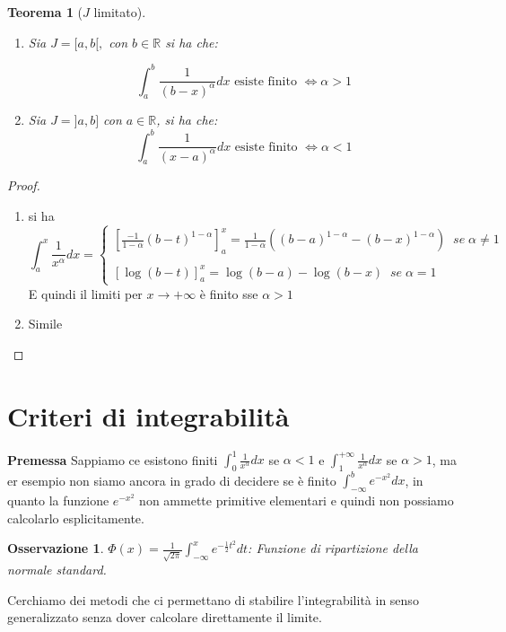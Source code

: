 \documentclass[a4paper; 11pt oneside]{book}
\theoremstyle{break}
\newtheorem{teo}{Teorema}[chapter]
\theoremstyle{peresempio}
\newtheorem{oss}[cor]{Osservazione}
\begin{document}
  \begin{teo}[$J$ limitato]
  \begin{enumerate}
    \item Sia $J=[a,b[,$ con $ b\in\mathbb{R}$ si ha che:
    
    $$ 
    \int_a^{b}\frac{1}{(b-x)^{\alpha}}dx \text{ esiste finito }\Leftrightarrow\alpha>1 
$$
    \item Sia $J=]a, b]$ con $a\in\mathbb{R}$, si ha che:
    $$
    	\int_{a}^b\frac{1}{(x-a)^{\alpha}}dx \text{ esiste finito }\Leftrightarrow\alpha<1 
    $$
  \end{enumerate}
  
  \end{teo}
  
  \begin{proof}
  \begin{enumerate}
  \item si ha
  $$\int_a^{x}\frac{1}{x^{\alpha}}dx=
  \begin{cases}
  \left[\frac{-1}{1-\alpha}(b-t)^{1-\alpha}\right]^x_a=\frac{1}{1-\alpha} \left((b-a)^{1-\alpha}-(b-x)^{1-\alpha}\right)\;\;se\;\alpha\neq 1 \\ \\
  \left[\log (b-t)\right]^x_a=\log (b-a)-\log (b-x)\;\; se \;\alpha=1
  \end{cases}
  $$
  E quindi il limiti per $x\to + \infty$ è finito sse $\alpha>1$
  \item Simile
  \end{enumerate}
  \end{proof}
\section{Criteri di integrabilità}%
\textbf{Premessa}\newline
Sappiamo ce esistono finiti $\int_0^1\frac{1}{x^\alpha}dx$ se $\alpha<1$ e $\int_1^{+\infty}\frac{1}{x^\alpha}dx$ se $\alpha>1$, ma er esempio non siamo ancora in grado di decidere se è finito $\int _{-\infty}^b e^{-x^2}dx$, in quanto la funzione $e^{-x^2}$ non ammette primitive elementari e quindi non possiamo calcolarlo esplicitamente.
\begin{oss}
$\Phi(x)=\frac{1}{\sqrt{2\pi}}\int_{-\infty}^xe^{-\frac{1}{2}t^2}dt$: Funzione di ripartizione della normale standard.
\end{oss}
Cerchiamo dei metodi che ci permettano di stabilire l'integrabilità in senso generalizzato senza dover calcolare direttamente il limite.
\end{document}
